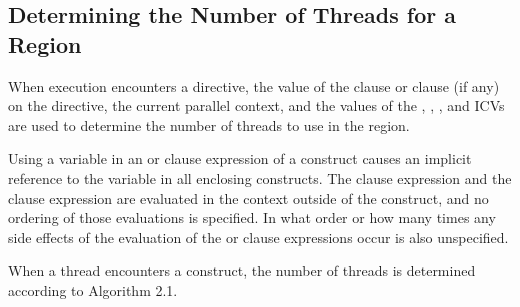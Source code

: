 \subsection{Determining the Number of Threads for a  Region}
\label{subsec:Determining the Number of Threads for a parallel Region}
When execution encounters a  directive, the value of the  
clause or  clause (if any) on the directive, the current parallel 
context, and the values of the , , 
, and 
ICVs are used to determine the number of threads to use in the region.

Using a variable in an  or  clause expression of a
 construct causes an implicit reference to the variable in all 
enclosing constructs. The  clause expression and the  
clause expression are evaluated in the context outside of the  
construct, and no ordering of those evaluations is specified. In what order or 
how many times any side effects of the evaluation of the  or 
 clause expressions occur is also unspecified.

When a thread encounters a  construct, the number of threads is 
determined according to Algorithm 2.1.



